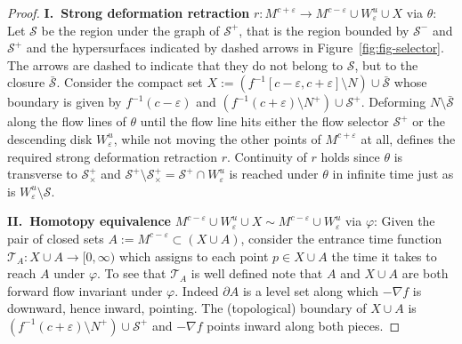 \documentclass{article}
\theoremstyle{definition}
\theoremstyle{remark}
\renewcommand{\1}{{{\mathchoice {\rm 1\mskip-4mu l} {\rm 1\mskip-4mu l}
{\rm 1\mskip-4.5mu l} {\rm 1\mskip-5mu l}}}}
\newcommand{\Ss}{{\mathcal{S}}}
\newcommand{\Tt}{{\mathcal{T}}}
\newcommand{\eps}{{\varepsilon}}
\newcommand{\p}{{\partial}}
\begin{document}
\begin{proof}
\vspace{.1cm}
\textbf{I.~Strong deformation retraction} $r:M^{c+\eps}\to
M^{c-\eps}\cup W^u_\eps\cup X$ via $\theta$:
Let $\Ss$ be the region under the graph of $\Ss^+$,
that is the region bounded by $\Ss^-$ and $\Ss^+$
and the hypersurfaces indicated by dashed arrows
in Figure~\ref{fig:fig-selector}. The arrows are dashed to
indicate that they do not belong to $\Ss$, but to the closure $\bar\Ss$.
Consider the compact set
$X:=\left(f^{-1}[c-\eps,c+\eps]\setminus N\right)\cup\bar\Ss$ whose
boundary is given by $f^{-1}(c-\eps)$ and
$\left(f^{-1}(c+\eps)\setminus N^+\right)\cup\Ss^+$.
Deforming $N\setminus\bar\Ss$ along the flow lines of $\theta$
until the flow line hits either the flow selector $\Ss^+$ or the
descending disk $W^u_\eps$, while not moving the other points
of $M^{c+\eps}$ at all, defines the required strong deformation
retraction $r$. Continuity of $r$ holds since $\theta$ is transverse to
$\Ss^+_\times$ and $\Ss^+\setminus\Ss^+_\times=\Ss^+\cap W^u_\eps$
is reached under $\theta$ in infinite time just as is
$W^u_\eps\setminus \Ss$.

\vspace{.1cm}
\textbf{II.~Homotopy equivalence} $M^{c-\eps}\cup W^u_\eps\cup X
\sim M^{c-\eps}\cup W^u_\eps$ via $\varphi$:
Given the pair of closed sets $A:=M^{c-\eps}\subset \left(X\cup A\right)$,
consider the entrance time function $\Tt_A:X\cup A\to [0,\infty)$
which assigns to each point $p\in X\cup A$ the time it takes to reach
$A$ under $\varphi$. To see that $\Tt_A$ is well defined note that
$A$ and $X\cup A$ are both forward flow invariant under $\varphi$.
Indeed $\p A$ is a level set along which $-\nabla f$ is downward,
hence inward, pointing. The (topological) boundary of $X\cup A$ is
$\left(f^{-1}(c+\eps)\setminus N^+\right)\cup\Ss^+$
and $-\nabla f$ points inward along both pieces.


\end{proof}
\end{document}
